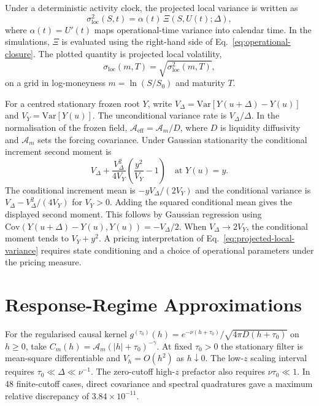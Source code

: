 \documentclass[11pt]{article}
\newcommand{\Aeff}{\mathcal A_{\mathrm{eff}}}
\newcommand{\sigloc}{\sigma_{\mathrm{loc}}}
\begin{document}
Under a deterministic activity clock, the projected local variance is written
as
\begin{equation}
 \sigloc^2(S,t)
 =
 \alpha(t)\,
 \Xi(S,U(t);\Delta),
 \label{eq:projected-local-variance}
\end{equation}
where \(\alpha(t)=U'(t)\) maps operational-time variance into calendar time. In the
simulations, \(\Xi\) is evaluated using the right-hand side of
Eq.~\eqref{eq:operational-closure}. The plotted quantity is projected local
volatility,
\begin{equation}
 \sigloc(m,T)=\sqrt{\sigloc^2(m,T)},
 \label{eq:plotted-volatility}
\end{equation}
on a grid in log-moneyness \(m=\ln(S/S_0)\) and maturity \(T\).

For a centred stationary frozen root \(Y\), write
\(V_\Delta=\mathrm{Var}[Y(u+\Delta)-Y(u)]\) and \(V_Y=\mathrm{Var}[Y(u)]\).
The unconditional variance rate is \(V_\Delta/\Delta\). In the normalisation
of the frozen field, \(\Aeff=\mathcal A_m/D\), where \(D\) is liquidity
diffusivity and \(\mathcal A_m\) sets the forcing covariance. Under Gaussian
stationarity the conditional increment second moment is
\[
 V_\Delta+\frac{V_\Delta^2}{4V_Y}\left(\frac{y^2}{V_Y}-1\right)
 \quad\text{at }Y(u)=y .
\]
The conditional increment mean is \(-y V_\Delta/(2V_Y)\) and the
conditional variance is \(V_\Delta-V_\Delta^2/(4V_Y)\) for \(V_Y>0\).
Adding the squared conditional mean gives the displayed second moment.
This follows by Gaussian regression using
\(\mathrm{Cov}(Y(u+\Delta)-Y(u),Y(u))=-V_\Delta/2\).
When \(V_\Delta\to2V_Y\), the conditional moment tends to \(V_Y+y^2\).
A pricing interpretation of Eq.~\eqref{eq:projected-local-variance}
requires state conditioning and a choice of operational parameters under
the pricing measure.

\section{Response-Regime Approximations}

For the regularised causal kernel
\(g^{(\tau_0)}(h)=e^{-\nu(h+\tau_0)}/\sqrt{4\pi D(h+\tau_0)}\)
on \(h\ge0\), take \(C_m(h)=\mathcal A_m(|h|+\tau_0)^{-\gamma}\).
At fixed \(\tau_0>0\) the stationary filter is mean-square differentiable
and \(V_h=O(h^2)\) as \(h\downarrow0\). The low-\(z\) scaling interval
requires \(\tau_0\ll\Delta\ll\nu^{-1}\). The zero-cutoff high-\(z\)
prefactor also requires \(\nu\tau_0\ll1\). In 48 finite-cutoff cases,
direct covariance and spectral quadratures gave a maximum relative
discrepancy of \(3.84\times10^{-11}\).
\end{document}

